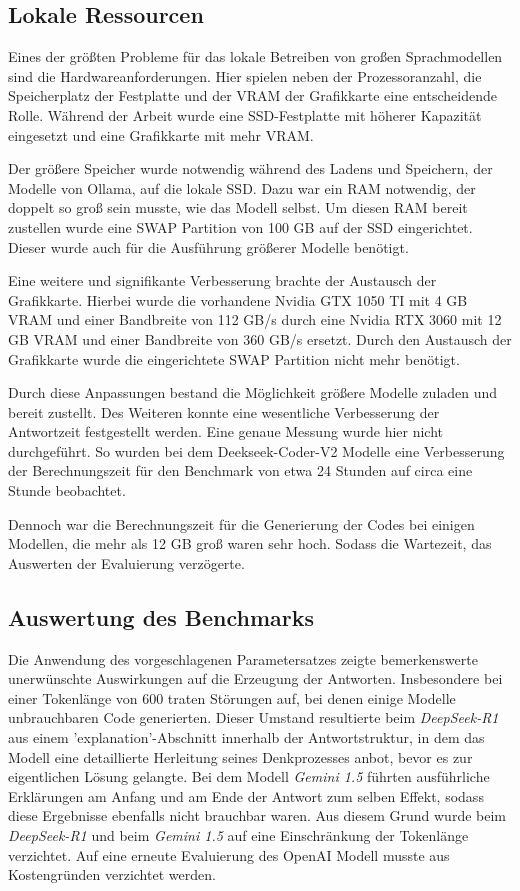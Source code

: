 \subsection{Lokale Ressourcen}
Eines der größten Probleme für das lokale Betreiben von großen Sprachmodellen sind die Hardwareanforderungen. Hier spielen neben der Prozessoranzahl, die Speicherplatz der Festplatte und der VRAM der Grafikkarte eine entscheidende Rolle. Während der Arbeit wurde eine SSD-Festplatte mit höherer Kapazität eingesetzt und eine Grafikkarte mit mehr VRAM.\vspace{0.2cm}

Der größere Speicher wurde notwendig während des Ladens und Speichern, der Modelle von Ollama, auf die lokale SSD. Dazu war ein RAM notwendig, der doppelt so groß sein musste, wie das Modell selbst. Um diesen RAM bereit zustellen wurde eine SWAP Partition von 100 GB auf der SSD eingerichtet. Dieser wurde auch für die Ausführung größerer Modelle benötigt.\vspace{0.2cm}

Eine weitere und signifikante Verbesserung brachte der Austausch der Grafikkarte. Hierbei wurde die vorhandene Nvidia GTX 1050 TI mit 4 GB VRAM und einer Bandbreite von 112 GB/s durch eine Nvidia RTX 3060 mit 12 GB VRAM und einer Bandbreite von 360 GB/s ersetzt. Durch den Austausch der Grafikkarte wurde die eingerichtete SWAP Partition nicht mehr benötigt.

Durch diese Anpassungen bestand die Möglichkeit größere Modelle zuladen und bereit zustellt. Des Weiteren konnte eine wesentliche Verbesserung der Antwortzeit festgestellt werden. Eine genaue Messung wurde hier nicht durchgeführt. So wurden bei dem Deekseek-Coder-V2 Modelle eine Verbesserung der Berechnungszeit für den Benchmark von etwa 24 Stunden auf circa eine Stunde beobachtet.\vspace{0.2cm}

Dennoch war die Berechnungszeit für die Generierung der Codes bei einigen Modellen, die mehr als 12 GB groß waren sehr hoch. Sodass die Wartezeit, das Auswerten der Evaluierung verzögerte.


\subsection{Auswertung des Benchmarks}
Die Anwendung des vorgeschlagenen Parametersatzes zeigte bemerkenswerte unerwünschte Auswirkungen auf die Erzeugung der Antworten. Insbesondere bei einer Tokenlänge von 600 traten Störungen auf, bei denen einige Modelle unbrauchbaren Code generierten. Dieser Umstand resultierte beim \textit{DeepSeek-R1} aus einem 'explanation'-Abschnitt innerhalb der Antwortstruktur, in dem das Modell eine detaillierte Herleitung seines Denkprozesses anbot, bevor es zur eigentlichen Lösung gelangte. Bei dem Modell \textit{Gemini 1.5} führten ausführliche Erklärungen am Anfang und am Ende der Antwort zum selben Effekt, sodass diese Ergebnisse ebenfalls nicht brauchbar waren. Aus diesem Grund wurde beim \textit{DeepSeek-R1} und beim \textit{Gemini 1.5} auf eine Einschränkung der Tokenlänge verzichtet. Auf eine erneute Evaluierung des OpenAI Modell musste aus Kostengründen verzichtet werden.\vspace{0.2cm}

